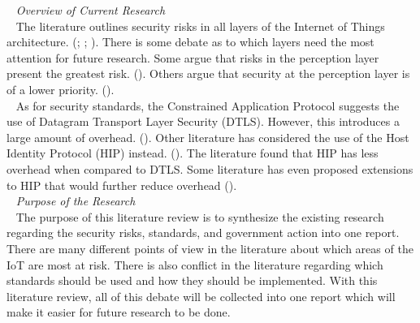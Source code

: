 \documentclass[letterpaper, 12pt]{texMemo}
\begin{document}
\begin{flushleft}
~\newline
\textit{Overview of Current Research}\\
~\newline
The literature outlines security risks in all layers of the Internet of Things architecture. (\cite{Xiaohui6643029}; \cite{Zhao6746513}; \cite{Suo6188257}). 
There is some debate as to which layers need the most attention for future research. Some argue that risks in the perception layer present the greatest risk. (\cite{Zhao6746513}).
Others argue that security at the perception layer is of a lower priority. (\cite{Kozlov}). \\
~\newline
As for security standards, the Constrained Application Protocol suggests the use of Datagram Transport Layer Security (DTLS). However, this introduces a large amount of overhead. (\cite{Capossele}).  
Other literature has considered the use of the Host Identity Protocol (HIP) instead. (\cite{Garcia-Morchon:2013:SII:2462096.2462117}). The literature found that HIP has less overhead when compared to
DTLS. Some literature has even proposed extensions to HIP that would further reduce overhead (\cite{Hummen}).\\
~\newline
\textit{Purpose of the Research}\\
~\newline
The purpose of this literature review is to synthesize the existing research regarding the security risks, standards, and government action into one report. There are many different points of view in the
literature about which areas of the IoT are most at risk. There is also conflict in the literature regarding which standards should be used and how they should be implemented. With this literature review,
all of this debate will be collected into one report which will make it easier for future research to be done. \\
~\newline


\end{flushleft}
\end{document}
